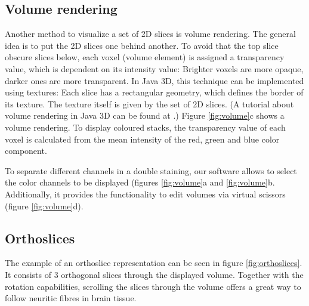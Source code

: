 \documentclass[a4paper,10pt]{article}
\begin{document}
\subsection{Volume rendering}
Another method to visualize a set of 2D slices is volume rendering.
The general idea is to put the 2D slices one behind another. To avoid that the top slice obscure slices below, each voxel (volume element) is assigned a transparency value, which is dependent on its intensity value: Brighter voxels are more opaque, darker ones are more transparent.
In Java 3D, this technique can be implemented using textures: Each slice has a rectangular geometry, which defines the border of its texture. The texture itself is given by the set of 2D slices. (A tutorial about volume rendering in Java 3D can be found at \cite{volrend}.)
Figure \ref{fig:volume}c shows a volume rendering. To display coloured stacks, the transparency value of each voxel is calculated from the mean intensity of the red, green and blue color component.

To separate different channels in a double staining, our software allows to select the color channels to be displayed (figures \ref{fig:volume}a and \ref{fig:volume}b. Additionally, it provides the functionality to edit volumes via virtual scissors (figure \ref{fig:volume}d).

\subsection{Orthoslices}
The example of an orthoslice representation can be seen in figure \ref{fig:orthoslices}.
It consists of 3 orthogonal slices through the displayed volume. Together with the rotation capabilities, scrolling the slices through the volume offers a great way to follow neuritic fibres in brain tissue.
\end{document}

